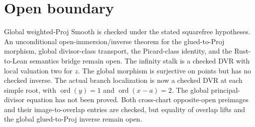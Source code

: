\documentclass[10pt]{article}
\begin{document}
\section*{Open boundary}
Global weighted-Proj Smooth is checked under the stated squarefree hypotheses. An unconditional open-immersion/inverse theorem for the glued-to-Proj morphism, global divisor-class transport, the Picard-class identity, and the Rust-to-Lean semantics bridge remain open. The infinity stalk is a checked DVR with local valuation two for $z$. The global morphism is surjective on points but has no checked inverse.
The actual branch localization is now a checked DVR at each simple root, with $\operatorname{ord}(y)=1$ and $\operatorname{ord}(x-a)=2$. The global principal-divisor equation has not been proved. Both cross-chart opposite-open preimages and their image-to-overlap entries are checked, but equality of overlap lifts and the global glued-to-Proj inverse remain open.
\end{document}
